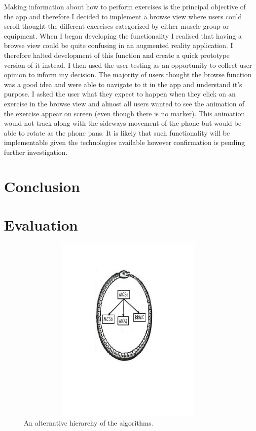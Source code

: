 \documentclass{l4proj}
\begin{document}
Making information about how to perform exercises is the principal objective of the app and therefore I decided to implement a browse view where users could scroll thought the different exercises categorized by either muscle group or equipment. When I began developing the functionality I realised that having a browse view could be quite confusing in an augmented reality application. I therefore halted development of this function and create a quick prototype version of it instead. I then used the user testing as an opportunity to collect user opinion to inform my decision. The majority of users thought the browse function was a good idea and were able to navigate to it in the app and understand it's purpose. I asked the user what they expect to happen when they click on an exercise in the browse view and almost all users wanted to see the animation of the exercise appear on screen (even though there is no marker). This animation would not track along with the sideways movement of the phone but would be able to rotate as the phone pans. It is likely that such functionality will be implementable given the technologies available however confirmation is pending further investigation. 

\chapter{Conclusion}

\chapter{Evaluation}

\begin{figure}
\centering
\includegraphics[height=9.2cm,width=13.2cm]{uroboros.pdf}
\vspace{-30mm}
\caption{An alternative hierarchy of the algorithms.}
\label{uroborus}
\end{figure}
\end{document}
